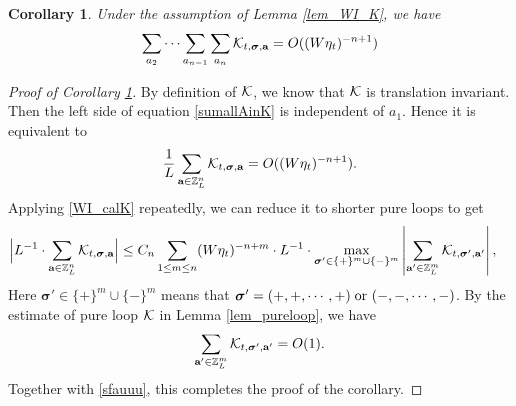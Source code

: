 \documentclass[10pt,reqno]{article}
\theoremstyle{plain} %
\newtheorem{corollary}[theorem]{Corollary}
\theoremstyle{remark}
\numberwithin{equation}{section}
\begin{document}
\begin{corollary}\label{lem_sumAinK}
    Under the assumption of Lemma \ref{lem_WI_K}, we have 
\begin{align}\label{sumallAinK}
      \sum_{a_2}\cdots\sum_{a_{n-1}}\sum_{a_n}{\cal K}_{t, \boldsymbol{\sigma}, \textbf{a}}=O((W\eta_t)^{-n+1})
\end{align}
 \end{corollary}
 


\begin{proof}[Proof of Corollary \ref{lem_sumAinK}]
By definition of $\cal K$, we know that ${\cal K}$ is  translation invariant. Then the left side  of equation \eqref{sumallAinK} is independent of $a_1$. 
Hence it is equivalent to 
$$
 \frac1L\sum_{\textbf{a}\in\mathbb Z_L^n}{\cal K}_{t, \boldsymbol{\sigma}, \textbf{a}}=O((W\eta_t)^{-n+1}).
$$
 Applying \eqref{WI_calK} repeatedly, we can reduce it to shorter pure loops to get  
\begin{align}\label{sfauuu}
 \Big | L^{-1}\cdot \sum_{\textbf{a}\in\mathbb Z_L^n}{\cal K}_{t, \boldsymbol{\sigma}, \textbf{a}}\Big |
  \le C_n \sum_{1\le m\le n}(W\eta_t)^{-n+m}\cdot L^{-1}\cdot
  \max_{\boldsymbol{\sigma}'\in \{+\}^m \cup \{-\}^m}\left| \sum_{\textbf{a}'\in\mathbb Z_L^m}{\cal K}_{t, \boldsymbol{\sigma}', \textbf{a}'}\right|,\quad 
\end{align}
Here $\boldsymbol{\sigma}'\in \{+\}^m \cup \{-\}^m$ means that $\boldsymbol{\sigma}'=(+,+,\cdots,+)\; \hbox{or }(-,-,\cdots,-)$.
By the estimate of pure loop $\cal K$  in   Lemma \ref{lem_pureloop}, we have 
$$
\sum_{\textbf{a}'\in\mathbb Z_L^m}{\cal K}_{t, \boldsymbol{\sigma}', \textbf{a}'}=O(1).
$$
Together with \eqref{sfauuu}, this  completes the proof of the corollary. 

\end{proof}



\bigskip
\end{document}
